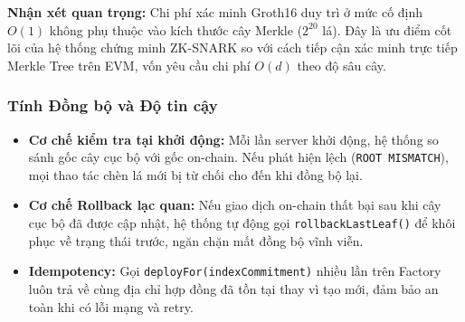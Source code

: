 \documentclass[../DoAn.tex]{subfiles}
\begin{document}
\begin{table}[H]
\centering
{}
\caption{Ước tính chi phí Gas trên Ethereum Sepolia}
\label{table:gas_cost}
\end{table}

\textbf{Nhận xét quan trọng:} Chi phí xác minh Groth16 duy trì ở mức cố định $O(1)$ không phụ thuộc vào kích thước cây Merkle ($2^{20}$ lá). Đây là ưu điểm cốt lõi của hệ thống chứng minh ZK-SNARK so với cách tiếp cận xác minh trực tiếp Merkle Tree trên EVM, vốn yêu cầu chi phí $O(d)$ theo độ sâu cây.

\subsubsection{Tính Đồng bộ và Độ tin cậy}

\begin{itemize}
    \item \textbf{Cơ chế kiểm tra tại khởi động:} Mỗi lần server khởi động, hệ thống so sánh gốc cây cục bộ với gốc on-chain. Nếu phát hiện lệch (\texttt{ROOT MISMATCH}), mọi thao tác chèn lá mới bị từ chối cho đến khi đồng bộ lại.

    \item \textbf{Cơ chế Rollback lạc quan:} Nếu giao dịch on-chain thất bại sau khi cây cục bộ đã được cập nhật, hệ thống tự động gọi \texttt{rollbackLastLeaf()} để khôi phục về trạng thái trước, ngăn chặn mất đồng bộ vĩnh viễn.

    \item \textbf{Idempotency:} Gọi \texttt{deployFor(indexCommitment)} nhiều lần trên Factory luôn trả về cùng địa chỉ hợp đồng đã tồn tại thay vì tạo mới, đảm bảo an toàn khi có lỗi mạng và retry.
\end{itemize}
\end{document}
